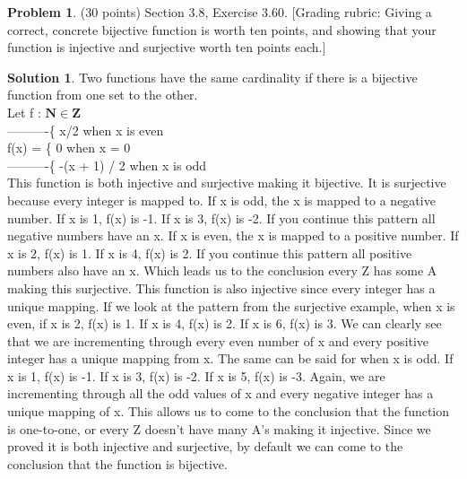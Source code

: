 \documentclass{article}
\theoremstyle{definition}
\newtheorem{problem}{Problem}
\newtheorem*{solution}{Solution}
\newcommand{\N}{\mathbf{N}}
\newcommand{\Z}{\mathbf{Z}}
\begin{document}
\begin{problem} (30 points) Section 3.8, Exercise 3.60.
[Grading rubric: Giving a correct, concrete bijective function is worth ten points, and showing
that your function is injective and surjective worth ten points each.]
\end{problem}
\begin{solution} 
Two functions have the same cardinality if there is a bijective function from one set to the other. \\
Let f : $\N \in \Z$ \\
----------\{ x/2 when x is even\\
f(x) = \{ 0 when x = 0 \\
----------\{ -(x + 1) / 2 when x is odd \\
This function is both injective and surjective making it bijective. It is surjective because every integer is mapped to. If x is odd, the x is mapped to a negative number. If x is 1, f(x) is -1. If x is 3, f(x) is -2. If you continue this pattern all negative numbers have an x. If x is even, the x is mapped to a positive number. If x is 2, f(x) is 1. If x is 4, f(x) is 2. If you continue this pattern all positive numbers also have an x. Which leads us to the conclusion every Z has some A making this surjective. This function is also injective since every integer has a unique mapping. If we look at the pattern from the surjective example, when x is even, if x is 2, f(x) is 1. If x is 4, f(x) is 2. If x is 6, f(x) is 3. We can clearly see that we are incrementing through every even number of x and every positive integer has a unique mapping from x. The same can be said for when x is odd. If x is 1, f(x) is -1. If x is 3, f(x) is -2. If x is 5, f(x) is -3. Again, we are incrementing through all the odd values of x and every negative integer has a unique mapping of x. This allows us to come to the conclusion that the function is one-to-one, or every Z doesn't have many A's making it injective. Since we proved it is both injective and surjective, by default we can come to the conclusion that the function is bijective.
\end{solution}
\end{document}
